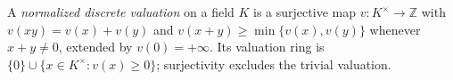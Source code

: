 
A \emph{normalized discrete valuation} on a field $K$ is a surjective map $v:K^\times\to\mathbb Z$ with $v(xy)=v(x)+v(y)$ and $v(x+y)\ge\min\{v(x),v(y)\}$ whenever $x+y\ne0$, extended by $v(0)=+\infty$. Its valuation ring is $\{0\}\cup\{x\in K^\times:v(x)\ge0\}$; surjectivity excludes the trivial valuation.
